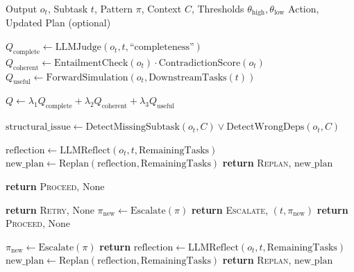 \documentclass{article}
\theoremstyle{plain}
\theoremstyle{definition}
\theoremstyle{remark}
\begin{document}
\begin{algorithm}[H]
	\caption{Reflective Checkpoint Mechanism (\rcm{})}
	\label{alg:rcm_detailed}
	\begin{algorithmic}[1]
		\REQUIRE Output $o_t$, Subtask $t$, Pattern $\pi$, Context $C$, Thresholds $\theta_{\text{high}}, \theta_{\text{low}}$
		\ENSURE Action, Updated Plan (optional)
		
		\STATE {}
		\STATE $Q_{\text{complete}} \leftarrow \text{LLMJudge}(o_t, t, \text{``completeness''})$
		\STATE $Q_{\text{coherent}} \leftarrow \text{EntailmentCheck}(o_t) \cdot \text{ContradictionScore}(o_t)$
		\STATE $Q_{\text{useful}} \leftarrow \text{ForwardSimulation}(o_t, \text{DownstreamTasks}(t))$
		
		\STATE $Q \leftarrow \lambda_1 Q_{\text{complete}} + \lambda_2 Q_{\text{coherent}} + \lambda_3 Q_{\text{useful}}$
		
		\STATE {}
		\STATE $\text{structural\_issue} \leftarrow \text{DetectMissingSubtask}(o_t, C) \lor \text{DetectWrongDeps}(o_t, C)$
		
		\STATE $\text{reflection} \leftarrow \text{LLMReflect}(o_t, t, \text{RemainingTasks})$
		\STATE $\text{new\_plan} \leftarrow \text{Replan}(\text{reflection}, \text{RemainingTasks})$
		\STATE \textbf{return} \textsc{Replan}, $\text{new\_plan}$
		\ENDIF
		
		\STATE \textbf{return} \textsc{Proceed}, None
		\ENDIF
		
		\STATE \textbf{return} \textsc{Retry}, None
		\STATE $\pi_{\text{new}} \leftarrow \text{Escalate}(\pi)$
		\STATE \textbf{return} \textsc{Escalate}, $(t, \pi_{\text{new}})$
		\ELSE
		\STATE \textbf{return} \textsc{Proceed}, None 
		\ENDIF
		\ENDIF
		
		\STATE {}
		\STATE $\pi_{\text{new}} \leftarrow \text{Escalate}(\pi)$
		\STATE \textbf{return}
		\STATE $\text{reflection} \leftarrow \text{LLMReflect}(o_t, t, \text{RemainingTasks})$
		\STATE $\text{new\_plan} \leftarrow \text{Replan}(\text{reflection}, \text{RemainingTasks})$
		\STATE \textbf{return} \textsc{Replan}, $\text{new\_plan}$
		\ENDIF
		
	\end{algorithmic}
\end{algorithm}
\end{document}
